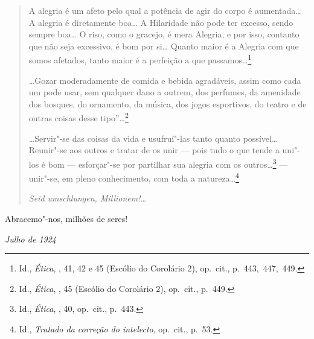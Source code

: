 \quebra

\begin{quote}
A alegria é um afeto pelo qual a potência de agir do corpo é
aumentada\ldots{} A alegria é diretamente boa\ldots{} A Hilaridade não pode ter
excesso, sendo sempre boa\ldots{} O riso, como o gracejo, é mera Alegria, e
por isso, contanto que não seja excessivo, é bom por si\ldots{} Quanto maior
é a Alegria com que somos afetados, tanto maior é a perfeição a que
passamos\ldots{}\footnote{Id., \emph{Ética}, , 41, 42 e 45 (Escólio do
  Corolário 2), op.~cit., p.~443,~447,~449.}

\ldots{}Gozar moderadamente de comida e bebida agradáveis, assim como cada
um pode usar, sem qualquer dano a outrem, dos perfumes, da amenidade dos
bosques, do ornamento, da música, dos jogos esportivos, do teatro e de
outras coisas desse tipo''\ldots{}\footnote{Id., \emph{Ética}, , 45
  (Escólio do Corolário 2), op.~cit., p.~449.}

\ldots{}Servir"-se das coisas da vida e usufruí"-las tanto quanto possível\ldots{}
Reunir"-se aos outros e tratar de os unir --- pois tudo o que tende a
uni"-los é bom --- esforçar"-se por partilhar sua alegria com os outros\ldots{}\footnote{Id.,
  \emph{Ética}, , 40, op.~cit., p.~443.}
--- unir"-se, em pleno conhecimento, com toda a natureza\ldots{}\footnote{Id.,
  \emph{Tratado da correção do intelecto}, op.~cit., p.~53.}

\emph{Seid umschlungen, Millionem!\ldots{}}
\end{quote}

Abracemo"-nos, milhões de seres!

\begin{flushright}
\emph{Julho de 1924}
\end{flushright}